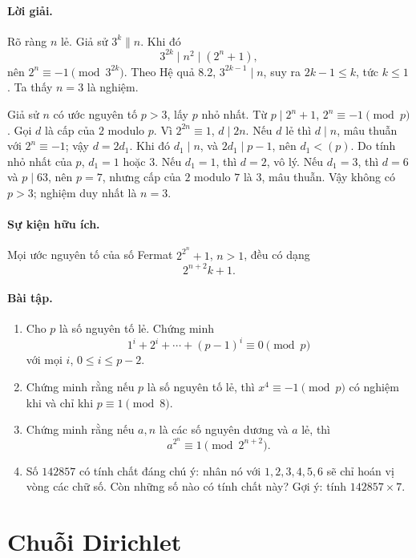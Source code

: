 \documentclass[11pt]{article}
\begin{document}
\paragraph{Lời giải.}
Rõ ràng \(n\) lẻ. Giả sử \(3^k\|n\). Khi đó
\[
 3^{2k}\mid n^2\mid(2^n+1),
\]
nên \(2^n\equiv-1\pmod{3^{2k}}\). Theo Hệ quả 8.2,
\(3^{2k-1}\mid n\), suy ra \(2k-1\le k\), tức \(k\le1\). Ta thấy \(n=3\) là
nghiệm.

Giả sử \(n\) có ước nguyên tố \(p>3\), lấy \(p\) nhỏ nhất. Từ
\(p\mid2^n+1\), \(2^n\equiv-1\pmod p\). Gọi \(d\) là cấp của \(2\) modulo
\(p\). Vì \(2^{2n}\equiv1\), \(d\mid2n\). Nếu \(d\) lẻ thì \(d\mid n\), mâu
thuẫn với \(2^n\equiv-1\); vậy \(d=2d_1\). Khi đó \(d_1\mid n\), và
\(2d_1\mid p-1\), nên \(d_1<(p)\). Do tính nhỏ nhất của \(p\), \(d_1=1\) hoặc
\(3\). Nếu \(d_1=1\), thì \(d=2\), vô lý. Nếu \(d_1=3\), thì \(d=6\) và
\(p\mid63\), nên \(p=7\), nhưng cấp của \(2\) modulo \(7\) là \(3\), mâu
thuẫn. Vậy không có \(p>3\); nghiệm duy nhất là \(n=3\).

\paragraph{Sự kiện hữu ích.}
Mọi ước nguyên tố của số Fermat \(2^{2^n}+1\), \(n>1\), đều có dạng
\[
 2^{n+2}k+1.
\]

\paragraph{Bài tập.}
\begin{enumerate}
\item Cho \(p\) là số nguyên tố lẻ. Chứng minh
\[
 1^i+2^i+\cdots+(p-1)^i\equiv0\pmod p
\]
với mọi \(i\), \(0\le i\le p-2\).
\item Chứng minh rằng nếu \(p\) là số nguyên tố lẻ, thì \(x^4\equiv-1\pmod p\)
có nghiệm khi và chỉ khi \(p\equiv1\pmod8\).
\item Chứng minh rằng nếu \(a,n\) là các số nguyên dương và \(a\) lẻ, thì
\[
 a^{2^n}\equiv1\pmod{2^{n+2}}.
\]
\item Số \(142857\) có tính chất đáng chú ý: nhân nó với \(1,2,3,4,5,6\) sẽ
chỉ hoán vị vòng các chữ số. Còn những số nào có tính chất này? Gợi ý: tính
\(142857\times7\).
\end{enumerate}

\section{Chuỗi Dirichlet}
\end{document}

